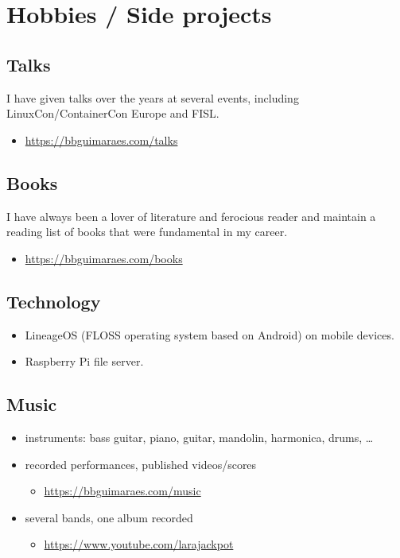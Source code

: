 \section*{Hobbies / Side projects}
\label{sec:etc}

\subsection*{Talks}

I have given talks over the years at several events, including
LinuxCon/ContainerCon Europe and FISL.

\begin{itemize}
    \item \url{https://bbguimaraes.com/talks}
\end{itemize}

\subsection*{Books}

I have always been a lover of literature and ferocious reader and maintain a
reading list of books that were fundamental in my career.

\begin{itemize}
    \item \url{https://bbguimaraes.com/books}
\end{itemize}

\subsection*{Technology}

\begin{itemize}
    \item
        LineageOS (FLOSS operating system based on Android) on mobile devices.
    \item Raspberry Pi file server.
\end{itemize}

\subsection*{Music}

\begin{itemize}
    \item instruments: bass guitar, piano, guitar, mandolin, harmonica, drums, …
    \item recorded performances, published videos/scores
        \begin{itemize}
            \item \url{https://bbguimaraes.com/music}
        \end{itemize}
    \item several bands, one album recorded
        \begin{itemize}
            \item \url{https://www.youtube.com/larajackpot}
        \end{itemize}
\end{itemize}

